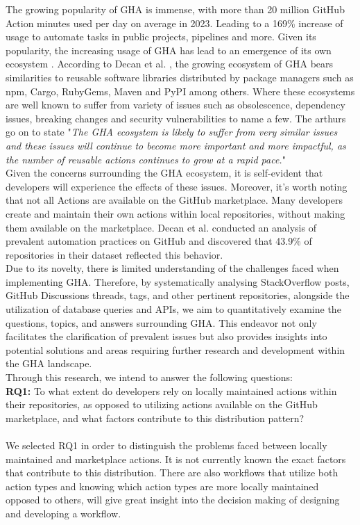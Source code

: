 \documentclass[conference]{IEEEtran}
\begin{document}
    The growing popularity of GHA is immense, with more than 20 million GitHub Action minutes used per day on average in 2023. Leading to a 169\% increase of usage to automate tasks in public projects,  pipelines and more\cite{b3}. Given its popularity,  the increasing usage of GHA has lead to an emergence of its own ecosystem \cite{b4}.  According to Decan et al. \cite{b4}, the growing ecosystem of GHA bears similarities to reusable software libraries distributed by package managers such as npm, Cargo, RubyGems, Maven and PyPI among others. Where these ecosystems are well known to suffer from variety of issues such as obsolescence, dependency issues, breaking changes and security vulnerabilities to name a few\cite{b4}. The arthurs go on to state "\textit{The GHA ecosystem is likely to suffer from very similar issues and these issues will continue to become more important and more impactful, as the number of reusable actions continues to grow at a rapid pace.}"\\

    Given the concerns surrounding the GHA ecosystem, it is self-evident that developers will experience the effects of these issues.  Moreover, it's worth noting that not all Actions are available on the GitHub marketplace. Many developers create and maintain their own actions within local repositories, without making them available on the marketplace. Decan et al. \cite{b4} conducted an analysis of prevalent automation practices on GitHub and discovered that 43.9\% of repositories in their dataset reflected this behavior.\\

    Due to its novelty, there is limited understanding of the challenges faced when implementing GHA.  
Therefore,  by systematically analysing StackOverflow posts, GitHub Discussions threads, tags, and other pertinent repositories, alongside the utilization of database queries and APIs, we aim to quantitatively examine the questions, topics, and answers surrounding GHA. This endeavor not only facilitates the clarification of prevalent issues but also provides insights into potential solutions and areas requiring further research and development within the GHA landscape.\\

Through this research, we intend to answer the following questions:
\\


     \textbf{RQ1:} To what extent do developers rely on locally maintained actions within their repositories, as opposed to utilizing actions available on the GitHub marketplace, and what factors contribute to this distribution pattern?
\\
\\
We selected RQ1 in order to distinguish the problems faced between locally maintained and marketplace actions. It is not currently known the exact factors that contribute to this distribution. There are also workflows that utilize both action types and knowing which action types are more locally maintained opposed to others, will give great insight into the decision making of designing and developing a workflow. \\
\end{document}
